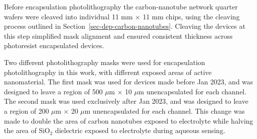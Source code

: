 \documentclass[
  a4paper,
]{scrbook}
\begin{document}
Before encapsulation photolithography the carbon-nanotube network
quarter wafers were cleaved into individual 11 mm \(\times\) 11 mm
chips, using the cleaving process outlined in
Section~\ref{sec-dep-carbon-nanotubes}. Cleaving the devices at this
step simplified mask alignment and ensured consistent thickness across
photoresist encapsulated devices.

Two different photolithography masks were used for encapsulation
photolithography in this work, with different exposed areas of active
nanomaterial. The first mask was used for devices made before Jan 2023,
and was designed to leave a region of 500 \(\mu\)m \(\times\) 10
\(\mu\)m unencapsulated for each channel. The second mask was used
exclusively after Jan 2023, and was designed to leave a region of 200
\(\mu\)m \(\times\) 20 \(\mu\)m unencapsulated for each channel. This
change was made to double the area of carbon nanotubes exposed to
electrolyte while halving the area of SiO\(_2\) dielectric exposed to
electrolyte during aqueous sensing.
\end{document}
